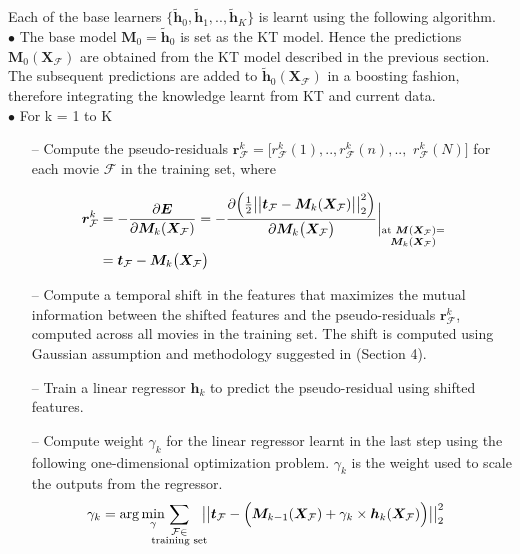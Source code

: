 \documentclass{article}
\begin{document}
Each of the base learners $\{\tilde{\bm h}_0, \tilde{\bm h}_1, .., \tilde{\bm h}_K\}$ is learnt using the following algorithm.
\\

\noindent$\bullet$ The base model $\bm M_0 = \tilde{\bm h}_0$ is set as the KT model. 
Hence the predictions $\bm M_0(\bm X_\mathcal F)$ are obtained from the KT model described in the previous section. 
The subsequent predictions are added to $\tilde{\bm h}_0(\bm X_\mathcal F)$ in a boosting fashion, therefore integrating the knowledge learnt from KT and current data.\\ 

\noindent $\bullet$ For k = 1 to K 

\begin{itemize}
\item[--] Compute the pseudo-residuals ${\bm r}_{\mathcal F}^k = [r^k_\mathcal F(1), .., r^k_\mathcal F(n), .., $ $r^k_\mathcal F(N)]$ for each movie $\mathcal F$ in the training set, where	

\begin{equation} \label{pseudores}
\begin{aligned}
\hspace{-4mm}\bm r^k_\mathcal F &= -\frac {\partial \bm E} {\partial \bm M_k(\bm X_\mathcal F)} 
= - { \frac {\partial \Big({\frac{1}{2}\big|\big| \bm t_\mathcal F - {\bm M}_k (\bm X_\mathcal F)\big|\big|^2_2}\Big)} {\partial {\bm M}_k\big({\bm X}_\mathcal F\big)} \bigg|}_{\substack{{\text{at }{\bm M}({\bm X}_\mathcal F) =} \\ {{\bm M}_k({\bm X}_\mathcal F)}}}\\
&= \bm t_\mathcal F - \bm M_k\big( \bm X_\mathcal F \big)
\end{aligned}
\end{equation}

\item[--] Compute a temporal shift in the features that maximizes the mutual information between the shifted features and the pseudo-residuals $\bm r^k_\mathcal F$, computed across all movies in the training set.
The shift is computed using Gaussian assumption and methodology suggested in \cite{mariooryad2015correcting} (Section 4).

\item[--] Train a linear regressor $\bm h_k$ to predict the pseudo-residual using shifted features.

\item[--] Compute weight $\gamma_k$ for the linear regressor learnt in the last step using the following one-dimensional optimization problem. $\gamma_k$ is the weight used to scale the outputs from the regressor. 
\begin{equation}
\hspace{-3mm}\gamma_k = \arg\min_{\gamma} \hspace{-4mm} \sum_{\substack{{\mathcal F \in} \\ {\text{training set}}}}\hspace{-2mm} \big|\big| \bm t_\mathcal F - \Big( \bm M_{k-1} (\bm X_\mathcal F) + \gamma_k \times \bm h_k(\bm X_\mathcal F)\Big) \big|\big|^2_2
\end{equation} 


\end{itemize}
\end{document}
